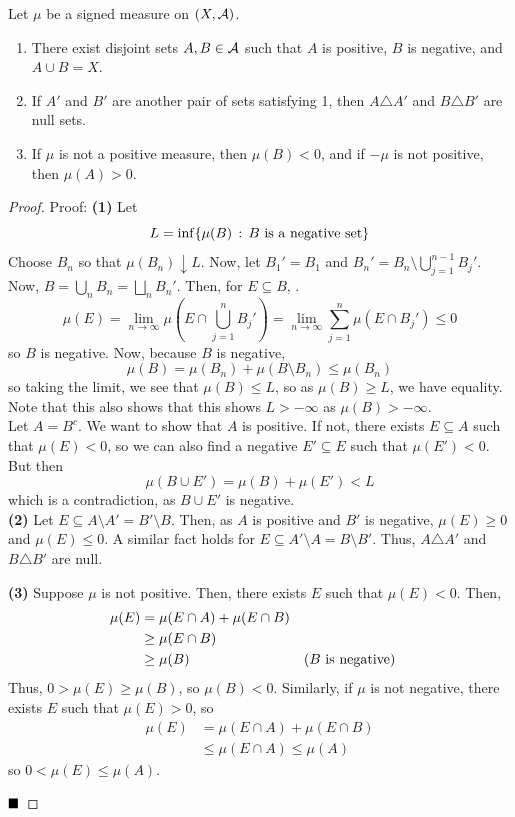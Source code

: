 \begin{theorem}
    Let $\mu$ be a signed measure on $(X, \cal{A})$.
    \begin{enumerate}
        \item There exist disjoint sets $A, B \in \cal{A}$ such that $A$ is positive, $B$ is negative, and $A \cup B = X$. 
        \item If $A'$ and $B'$ are another pair of sets satisfying 1, then $A \triangle A'$ and $B \triangle B'$ are null sets.
        \item If $\mu$ is not a positive measure, then $\mu(B) < 0$, and if $-\mu$ is not positive, then $\mu(A) > 0$.
    \end{enumerate}
\end{theorem}
\begin{proof}{Proof:}
    \textbf{(1)} Let
    \[ L = \inf\{\mu(B) \col B \tt{ is a negative set}\} \]
    Choose $B_n$ so that $\mu(B_n) \downarrow L$. Now, let $B_1' = B_1$ and $B_n' = B_n \setminus \bigcup_{j = 1}^{n - 1} B_j'$. Now, $B = \bigcup_{n} B_n = \bigsqcup_{n} B_n'$. Then, for $E \subseteq B$,
  .
    \[ \mu(E) = \lim_{n \to \infty} \mu \left(E \cap \bigcup_{j = 1}^{n} B_j'\right) = \lim_{n \to \infty} \sum_{j = 1}^{n} \mu(E \cap B_j') \leq 0 \]
    so $B$ is negative. Now, because $B$ is negative,
    \[ \mu(B) = \mu(B_n) + \mu(B \setminus B_n) \leq \mu(B_n) \]
    so taking the limit, we see that $\mu(B) \leq L$, so as $\mu(B) \geq L$, we have equality. Note that this also shows that this shows $L > -\infty$ as $\mu(B) > -\infty$.\\

    Let $A = B^{c}$. We want to show that $A$ is positive. If not, there exists $E \subseteq A$ such that $\mu(E) < 0$, so we can also find a negative $E' \subseteq E$ such that $\mu(E') < 0$. But then
    \[ \mu(B \cup E') = \mu(B) + \mu(E') < L \]
    which is a contradiction, as $B \cup E'$ is negative.\\

    \textbf{(2)} Let $E \subseteq A \setminus A' = B' \setminus B$. Then, as $A$ is positive and $B'$ is negative, $\mu(E) \geq 0$ and $\mu(E) \leq 0$. A similar fact holds for $E \subseteq A' \setminus A = B \setminus B'$. Thus, $A \triangle A'$ and $B \triangle B'$ are null.

    \textbf{(3)} Suppose $\mu$ is not positive. Then, there exists $E$ such that $\mu(E) < 0$. Then,
    \begin{align*}
        \mu(E) &= \mu(E \cap A) + \mu(E \cap B)\\
        &\geq \mu(E \cap B)\\
        &\geq \mu(B) && (B \tt{ is negative})
    \end{align*}
    Thus, $0 > \mu(E) \geq \mu(B)$, so $\mu(B) < 0$. Similarly, if $\mu$ is not negative, there exists $E$ such that $\mu(E) > 0$, so
    \begin{align*}
        \mu(E) &= \mu(E \cap A) + \mu(E \cap B)\\
        &\leq \mu(E \cap A) \leq \mu(A)
    \end{align*}
    so $0 < \mu(E) \leq \mu(A)$.

    $\qed$
\end{proof}

